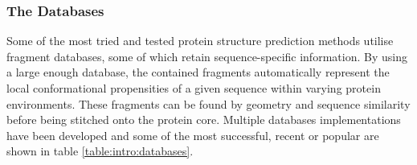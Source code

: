 \subsubsection{The Databases}

Some of the most tried and tested protein structure prediction methods utilise  fragment databases, some of which retain sequence-specific information. By using a large enough database, the contained fragments automatically represent the local conformational propensities of a given sequence within varying protein
environments. These fragments can be found by geometry and sequence similarity before being stitched onto the protein core. Multiple databases implementations have been developed and some of the most successful, recent or popular
are shown in table \ref{table:intro:databases}.


